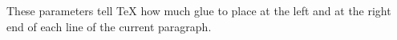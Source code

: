 \setlength{\leftskip}{4em}
\setlength{\rightskip}{1em}
These parameters tell \TeX{} how much glue
to place at the left and at the right end
of each line of the current paragraph.
